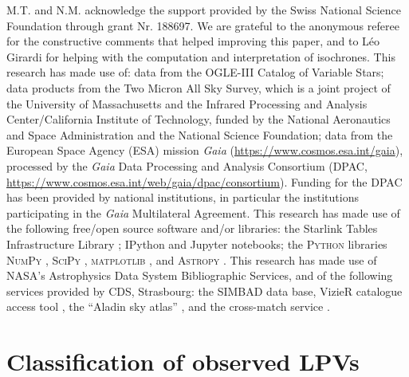 \documentclass[letter]{aa}
\begin{document}
\begin{acknowledgements}
M.T. and N.M. acknowledge the support provided by the Swiss National Science Foundation through grant Nr. 188697.
We are grateful to the anonymous referee for the constructive comments that helped improving this paper, and to Léo Girardi for helping with the computation and interpretation of isochrones.
This research has made use of: data from the \mbox{OGLE-III} Catalog of Variable Stars; data products from the Two Micron All Sky Survey, which is a joint project of the University of Massachusetts and the Infrared Processing and Analysis Center/California Institute of Technology, funded by the National Aeronautics and Space Administration and the National Science Foundation; data from the European Space Agency (ESA) mission {\it Gaia} (\url{https://www.cosmos.esa.int/gaia}), processed by the {\it Gaia} Data Processing and Analysis Consortium (DPAC, \url{https://www.cosmos.esa.int/web/gaia/dpac/consortium}). Funding for the DPAC has been provided by national institutions, in particular the institutions participating in the {\it Gaia} Multilateral Agreement.
This research has made use of the following free/open source software and/or libraries: the Starlink Tables Infrastructure Library \citep[STILTS and Topcat,][]{Taylor_2006}; IPython \citep{ipython} and Jupyter \citep{jupyter} notebooks; the \textsc{Python} libraries \textsc{NumPy} \citep{numpy2020}, \textsc{SciPy} \citep{SciPy}, \textsc{matplotlib} \citep[a \textsc{Python} library for publication quality graphics,][]{matplotlib}, and \textsc{Astropy} \citep[a community-developed core \textsc{Python} package for Astronomy,][]{astropy2018}. This research has made use of NASA's Astrophysics Data System Bibliographic Services, and of the following services provided by CDS, Strasbourg: the SIMBAD data base, VizieR catalogue access tool \citep[DOI: 10.26093/cds/vizier,][]{Ochsenbein_etal_2000}, the ``Aladin sky atlas'' \citep{Bonnarel_etal_2000}, and the cross-match service \citep{Boch_etal_2012,Pineau_etal_2020}.
\end{acknowledgements}




\appendix

\section{Classification of observed LPVs}
\label{asec:ClassificationOfObservedLPVs}
\end{document}

